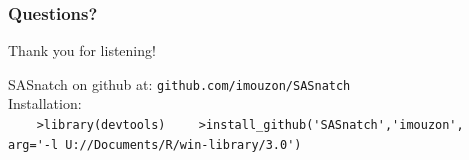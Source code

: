 \documentclass[xcolor=dvipsnames,gray,mathserif]{beamer}
\begin{document}
\begin{frame}[fragile]
   \frametitle{Questions?}

   \centerline{\LARGE{Thank you for listening!}} \vspace{2cm}

   SASnatch on github at: \verb!github.com/imouzon/SASnatch! \vspace{.4cm} \\

   Installation: \\
   \verb!    >library(devtools)!
   \verb!    >install_github('SASnatch','imouzon',!
   \verb!                    arg='-l U://Documents/R/win-library/3.0')!

\end{frame}
\end{document}

